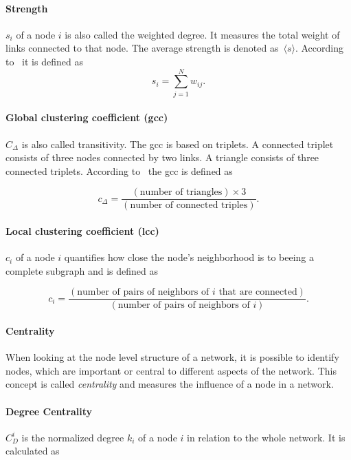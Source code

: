 \paragraph{Strength} $s_i$ of a node $i$ is also called the weighted degree.
It measures the total weight of links connected to that node.
The average strength is denoted as~$\langle s \rangle$.
According to~\textcite{barrat2004architecture} it is defined as
\begin{equation}
\label{eq:strength}
s_i = \sum_{j=1}^{N}w_{ij}. 
\end{equation}

\paragraph{Global clustering coefficient (gcc)} $C_\Delta$ is also called transitivity. The gcc is based on triplets. A connected triplet consists of three nodes connected by two links. A triangle consists of three connected triplets. 
 According to~\textcite{wasserman1994social} the gcc is defined as
 
\begin{equation}
\label{eq:gcc}
c_\Delta = \frac{(\text{number of triangles}) \times 3}{(\text{number of connected triples})}.
\end{equation}

\paragraph{Local clustering coefficient (lcc)} $c_i$ of a node $i$ quantifies how close the node's neighborhood is to beeing a complete subgraph and is defined as

\begin{equation}
\label{eq:lcc}
c_i = \frac{(\text{number of pairs of neighbors of }i\text{ that are connected})}{(\text{number of pairs of neighbors of }i)}.
\end{equation}

\paragraph{Centrality}
When looking at the node level structure of a network, it is possible to identify nodes, which are important or central to different aspects of the network. This concept is called \emph{centrality} and measures the influence of a node in a network.

\paragraph{Degree Centrality}
$C^i_D$ is the normalized degree $k_i$ of a node $i$ in relation to the whole network. It is calculated as

